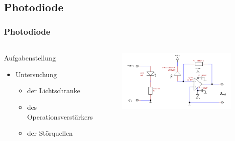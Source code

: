 \subsection{Photodiode} %
\label{sub:Photodiode}
\begin{frame}
    \frametitle{Photodiode}
    \framesubtitle{}
    \begin{columns}[c]
            \begin{block}{Aufgabenstellung}
                 \begin{itemize}
                    \item Untersuchung 
                    \begin{itemize}
                        \item der Lichtschranke
                        \item des Operationsverstärkers
                        \item der Störquellen
                    \end{itemize}
                 \end{itemize}
            \end{block}
            \begin{figure}[H]
            \begin{center}
                    \includegraphics[scale=0.2]{./img/schaltung/photo.png}
            \end{center}
            \end{figure}
    \end{columns}
\end{frame}
